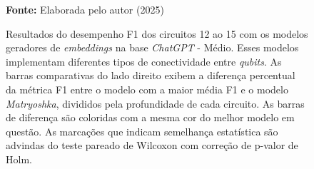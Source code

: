 \begin{figure}
\caption{Resultados do desempenho F1 dos circuitos 12 ao 15 com os modelos geradores de \textit{embeddings} na base \textit{ChatGPT} - Médio. Esses modelos implementam diferentes tipos de conectividade entre \textit{qubits}. As barras comparativas do lado direito exibem a diferença percentual da métrica F1 entre o modelo com a maior média F1 e o modelo \textit{Matryoshka}, divididos pela profundidade de cada circuito. As barras de diferença são coloridas com a mesma cor do melhor modelo em questão. As marcações que indicam semelhança estatística são advindas do teste pareado de Wilcoxon com correção de p-valor de Holm.}
\label{fig:model_transformer:medium:g3}
     \centering
    \centering

      \par\medskip\ABNTEXfontereduzida\selectfont\textbf{Fonte:} Elaborada pelo autor (2025) \par\medskip
\end{figure}